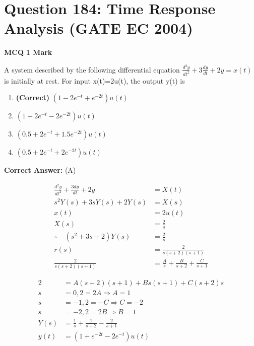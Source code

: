 \documentclass[11pt,a4paper]{article}
\begin{document}
\section*{Question 184: Time Response Analysis (GATE EC 2004)}
\noindent \textbf{\color{primary}MCQ} \hfill \textbf{\color{secondary}1 Mark}


\noindent A system described by the following differential equation $\frac{d^{2}y}{dt^{2}}+3\frac{dy}{dt}+2y=x(t)$ is initially at rest. For input x(t)=2u(t), the output y(t) is


\begin{enumerate}[label=(\Alph*)]
    \item \textbf{(Correct)} $(1-2e^{-t}+e^{-2t})u(t)$
    \item $(1+2e^{-t}-2e^{-2t})u(t)$
    \item $(0.5+2e^{-t}+1.5e^{-2t})u(t)$
    \item $(0.5+2e^{-t}+2e^{-2t})u(t)$
\end{enumerate}

\noindent \textbf{Correct Answer:} (A)

\begin{tcolorbox}[solbox, title=Detailed Solution -- Question 184]
\[
\begin{aligned} \frac{d^{2} y}{d t^{2}}+\frac{3 d y}{d t}+2 y &=X(t) \\ s^{2} Y(s)+3 s Y(s)+2 Y(s) &=X(s) \\ x(t) &=2 u(t) \\ X(s) &=\frac{2}{s} \\ \therefore \quad\left(s^{2}+3 s+2\right) Y(s) &=\frac{2}{s} \\ r(s) &=\frac{2}{s(s+2)(s+1)} \\ \frac{2}{s(s+2)(s+1)} &=\frac{A}{s}+\frac{B}{s+2}+\frac{C}{s+1} \end{aligned}
\]

\[
\begin{aligned} 2&=A(s+2)(s+1)+B s(s+1)+C(s+2) s \\ s&=0,2=2 A \Rightarrow A=1 \\ s&=-1,2=-C \Rightarrow C=-2 \\ s&=-2,2=2 B \Rightarrow B=1 \\ Y(s)&=\frac{1}{s}+\frac{1}{s+2}-\frac{2}{s+1} \\ y(t)&=(1+e^{-2 t}-2 e^{-t}) u(t)  \end{aligned}
\]
\end{tcolorbox}
\end{document}
